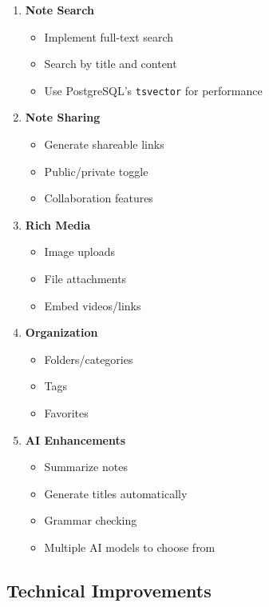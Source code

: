 \documentclass[11pt,a4paper]{article}
\begin{document}
\begin{enumerate}
    \item \textbf{Note Search}
    \begin{itemize}
        \item Implement full-text search
        \item Search by title and content
        \item Use PostgreSQL's \texttt{tsvector} for performance
    \end{itemize}
    
    \item \textbf{Note Sharing}
    \begin{itemize}
        \item Generate shareable links
        \item Public/private toggle
        \item Collaboration features
    \end{itemize}
    
    \item \textbf{Rich Media}
    \begin{itemize}
        \item Image uploads
        \item File attachments
        \item Embed videos/links
    \end{itemize}
    
    \item \textbf{Organization}
    \begin{itemize}
        \item Folders/categories
        \item Tags
        \item Favorites
    \end{itemize}
    
    \item \textbf{AI Enhancements}
    \begin{itemize}
        \item Summarize notes
        \item Generate titles automatically
        \item Grammar checking
        \item Multiple AI models to choose from
    \end{itemize}
\end{enumerate}

\subsection{Technical Improvements}
\end{document}
